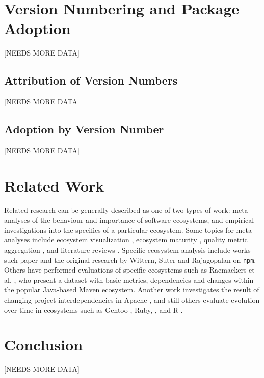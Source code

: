 \documentclass[10pt,conference]{IEEEtran}
\def\code#1{\texttt{#1}}
\begin{document}
\section{Version Numbering and Package Adoption}
[NEEDS MORE DATA]

\subsection{Attribution of Version Numbers}
[NEEDS MORE DATA

\subsection{Adoption by Version Number}
[NEEDS MORE DATA]

\section{Related Work}

Related research can be generally described as one of two types
of work: meta-analyses of the behaviour and importance
of software ecosystems, and empirical investigations into the
specifics of a particular ecosystem. Some topics 
for meta-analyses include ecosystem visualization \cite{LUNGU2010264},
ecosystem maturity \cite{Alves:2011}, quality metric aggregation \cite{Mordal:2013},
and literature reviews \cite{Manikas:2013, Manikas:2017}. Specific ecosystem analysis include works such
paper and the original research by Wittern, Suter and Rajagopalan \cite{Wittern:2016} on \code{npm}.
Others have performed evaluations of specific ecosystems such as Raemaekers et al. \cite{Raemaekers:2013},
who present a dataset with basic metrics, dependencies and changes within the popular 
Java-based Maven ecosystem. Another work investigates the
result of changing project interdependencies in Apache \cite{Bavota:2013}, 
and still others evaluate evolution over time in ecosystems such as
Gentoo \cite{Bloemen:2014}, Ruby, \cite{Kabbedijk:2011}, and R \cite{Plakidas:2017}.


\section{Conclusion}
[NEEDS MORE DATA]
\end{document}
